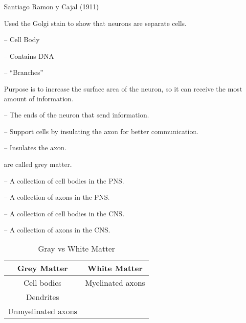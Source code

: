\begin{coloredlist}
    \item Santiago Ramon y Cajal (1911)
    \begin{coloredlist}
        \item Used the Golgi stain to show that neurons are separate cells.
    \end{coloredlist}
    \item {} -- Cell Body
    \item {} -- Contains DNA
    \item {} -- ``Branches''
    \begin{coloredlist}
        \item Purpose is to increase the surface area of the neuron, so it can receive the most amount of information.
    \end{coloredlist}
    \item {} -- The ends of the neuron that send information.
    \item {} -- Support cells by insulating the axon for better communication.
    \item {} -- Insulates the axon.
    \item {} are called grey matter.
    \item {} -- A collection of cell bodies in the PNS.
    \item {} -- A collection of axons in the PNS.
    \item {} -- A collection of cell bodies in the CNS.
    \item {} -- A collection of axons in the CNS.
\end{coloredlist}

\begin{table}[htbp]
    \centering
    \begin{tabular}{cc}
        \toprule
        \textbf{Grey Matter} & \textbf{White Matter} \\ \midrule
        Cell bodies          & Myelinated axons      \\
        Dendrites            &                       \\
        Unmyelinated axons   &                       \\
        \bottomrule
    \end{tabular}
    \caption{Gray vs White Matter}\label{tab:}
\end{table}

